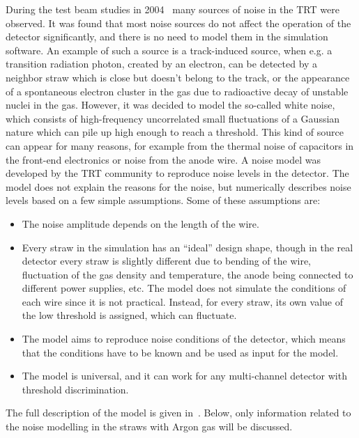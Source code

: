 During the test beam studies in 2004~\cite{trt_test_beam} many sources of noise in the TRT were observed.
It was found that most noise sources do not affect the operation of the detector significantly, and there is no need to model them in the simulation software.
An example of such a source is a track-induced source, when e.g. a transition radiation photon, created by an electron, can be detected by a neighbor straw which is close 
but doesn't belong to the track, or the appearance of a spontaneous electron cluster in the gas due to radioactive decay of unstable nuclei in the gas.
However, it was decided to model the so-called white noise, which consists of high-frequency uncorrelated small fluctuations of a Gaussian nature which can pile up high enough to reach a threshold. This kind of source can appear for many reasons, for example from the thermal noise of capacitors in the front-end electronics
or noise from the anode wire. A noise model was developed by the TRT community to reproduce noise levels in the detector.
The model does not explain the reasons for the noise, but numerically describes noise levels based on a few simple assumptions.
Some of these assumptions are:
\begin{itemize}
 \item The noise amplitude depends on the length of the wire.
 \item Every straw in the simulation has an ``ideal'' design shape, though in the real detector every straw is slightly different due to bending of the wire, 
 fluctuation of the gas density and temperature, the anode being connected to different power supplies, etc. The model does not simulate the conditions of each wire since it is not practical. 
 Instead, for every straw, its own value of the low threshold is assigned, which can fluctuate.
 \item The model aims to reproduce noise conditions of the detector, which means that the conditions have to be known and be used as input for the model.
 \item The model is universal, and it can work for any multi-channel detector with threshold discrimination.
\end{itemize}
The full description of the model is given in~\cite{kittelmann_thesis}. 
Below, only information related to the noise modelling in the straws with Argon gas will be discussed.

